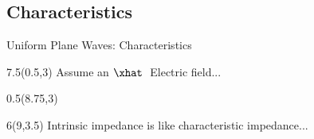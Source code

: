 \begin{lesson36}
\section{Characteristics}
\begin{frame}{Uniform Plane Waves: Characteristics}
\begin{textblock}{7.5}(0.5,3) 
Assume an $\xhat\;$ Electric field... 
\begin{small}
\end{small}
\end{textblock}


\begin{textblock}{0.5}(8.75,3)
	{\color{Blue4}{\rule{1pt}{2.8in}}}
\end{textblock}


\begin{textblock}{6}(9,3.5)
Intrinsic impedance is like characteristic impedance...
\begin{small}
\vspace{-8pt}
\end{small}


\end{textblock}
\end{frame}
\end{lesson36}
